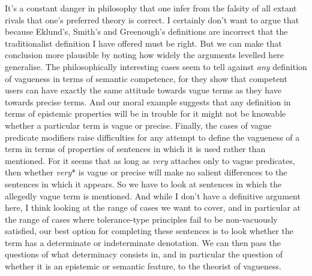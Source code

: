 It's a constant danger in philosophy that one infer from the falsity of all extant rivals that one's preferred theory is correct. I certainly don't want to argue that because Eklund's, Smith's and Greenough's definitions are incorrect that the traditionalist definition I have offered must be right. But we can make that conclusion more plausible by noting how widely the arguments levelled here generalise. The philosophically interesting cases seem to tell against \textit{any} definition of vagueness in terms of semantic competence, for they show that competent users can have exactly the same attitude towards vague terms as they have towards precise terms. And our moral example suggests that any definition in terms of epistemic properties will be in trouble for it might not be knowable whether a particular term is vague or precise. Finally, the cases of vague predicate modifiers raise difficulties for any attempt to define the vagueness of a term in terms of properties of sentences in which it is used rather than mentioned. For it seems that as long as \textit{very} attaches only to vague predicates, then whether \textit{very}* is vague or precise will make no salient differences to the sentences in which it appears. So we have to look at sentences in which the allegedly vague term is mentioned. And while I don't have a definitive argument here, I think looking at the range of cases we want to cover, and in particular at the range of cases where tolerance-type principles fail to be non-vacuously satisfied, our best option for completing these sentences is to look whether the term has a determinate or indeterminate denotation. We can then pass the questions of what determinacy consists in, and in particular the question of whether it is an epistemic or semantic feature, to the theorist of vagueness.

